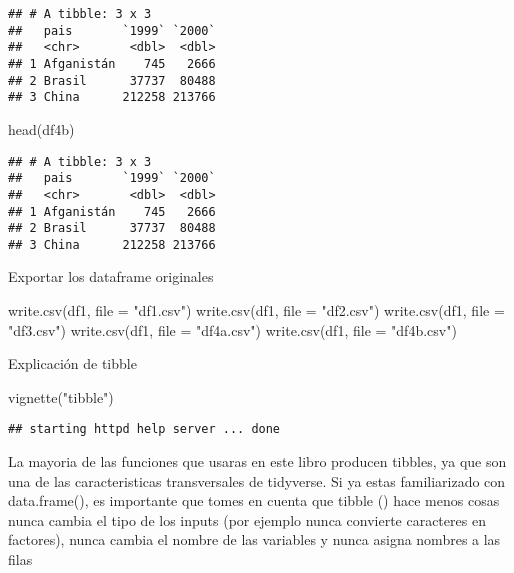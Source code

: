 \documentclass[
]{article}
\newenvironment{Shaded}{\begin{snugshade}}{\end{snugshade}}
\newcommand{\AttributeTok}[1]{\textcolor[rgb]{0.77,0.63,0.00}{#1}}
\newcommand{\FunctionTok}[1]{\textcolor[rgb]{0.00,0.00,0.00}{#1}}
\newcommand{\NormalTok}[1]{#1}
\newcommand{\StringTok}[1]{\textcolor[rgb]{0.31,0.60,0.02}{#1}}
\begin{document}
\begin{verbatim}
## # A tibble: 3 x 3
##   pais       `1999` `2000`
##   <chr>       <dbl>  <dbl>
## 1 Afganistán    745   2666
## 2 Brasil      37737  80488
## 3 China      212258 213766
\end{verbatim}

\begin{Shaded}
\begin{Highlighting}[]
\FunctionTok{head}\NormalTok{(df4b)}
\end{Highlighting}
\end{Shaded}

\begin{verbatim}
## # A tibble: 3 x 3
##   pais       `1999` `2000`
##   <chr>       <dbl>  <dbl>
## 1 Afganistán    745   2666
## 2 Brasil      37737  80488
## 3 China      212258 213766
\end{verbatim}

Exportar los dataframe originales

\begin{Shaded}
\begin{Highlighting}[]
\FunctionTok{write.csv}\NormalTok{(df1, }\AttributeTok{file =} \StringTok{"df1.csv"}\NormalTok{)}
\FunctionTok{write.csv}\NormalTok{(df1, }\AttributeTok{file =} \StringTok{"df2.csv"}\NormalTok{)}
\FunctionTok{write.csv}\NormalTok{(df1, }\AttributeTok{file =} \StringTok{"df3.csv"}\NormalTok{)}
\FunctionTok{write.csv}\NormalTok{(df1, }\AttributeTok{file =} \StringTok{"df4a.csv"}\NormalTok{)}
\FunctionTok{write.csv}\NormalTok{(df1, }\AttributeTok{file =} \StringTok{"df4b.csv"}\NormalTok{)}
\end{Highlighting}
\end{Shaded}

Explicación de tibble

\begin{Shaded}
\begin{Highlighting}[]
\FunctionTok{vignette}\NormalTok{(}\StringTok{"tibble"}\NormalTok{)}
\end{Highlighting}
\end{Shaded}

\begin{verbatim}
## starting httpd help server ... done
\end{verbatim}

La mayoria de las funciones que usaras en este libro producen tibbles,
ya que son una de las caracteristicas transversales de tidyverse. Si ya
estas familiarizado con data.frame(), es importante que tomes en cuenta
que tibble () hace menos cosas nunca cambia el tipo de los inputs (por
ejemplo nunca convierte caracteres en factores), nunca cambia el nombre
de las variables y nunca asigna nombres a las filas
\end{document}
